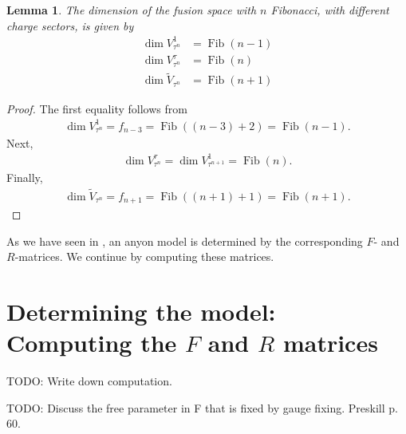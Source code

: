 \documentclass[a4paper,10pt,oneside]{book}
\theoremstyle{plain}
\newtheorem{lemma}[theorem]{Lemma}
\theoremstyle{definition}
\theoremstyle{remark}
\DeclareMathOperator{\Fib}{Fib}
\begin{document}
\begin{lemma}\label{lemma:fibonacci fusion space dimension}
  The dimension of the fusion space with $n$ Fibonacci, with different charge sectors, is given by
  \begin{align*}
    \dim V_{τ^n}^1 &= \Fib(n-1) \\
    \dim V_{τ^n}^τ &= \Fib(n) \\
    \dim \widetilde{V}_{τ^n} &= \Fib(n+1)
  \end{align*}
\end{lemma}

\begin{proof}
  The first equality follows from
  \begin{align*}
    \dim V_{τ^n}^1 = f_{n-3} = \Fib((n-3)+2) = \Fib(n-1).
  \end{align*}
  Next,
  \begin{align*}
    \dim V_{τ^n}^τ = \dim V_{τ^{n+1}}^1 = \Fib(n).
  \end{align*}
  Finally,
  \begin{align*}
    \dim \widetilde{V}_{τ^n} = f_{n+1} = \Fib((n+1)+1) = \Fib(n+1).
  \end{align*}
\end{proof}

As we have seen in \label{anyon models}, an anyon model is determined by the corresponding $F$- and $R$-matrices. We continue by computing these matrices.






\section{Determining the model: Computing the $F$ and $R$ matrices}

TODO: Write down computation.

TODO: Discuss the free parameter in F that is fixed by gauge fixing. Preskill p. 60.

\end{document}
